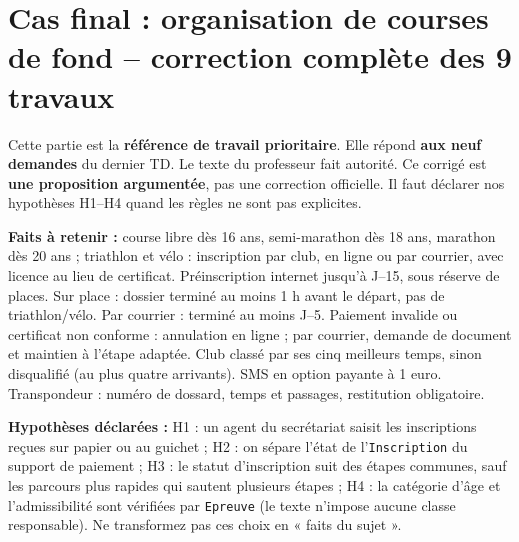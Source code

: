 \section{Cas final : organisation de courses de fond -- correction complète des 9 travaux}
\begin{memo}
Cette partie est la \textbf{référence de travail prioritaire}. Elle répond \textbf{aux neuf demandes} du dernier TD. Le texte du professeur fait autorité. Ce corrigé est \textbf{une proposition argumentée}, pas une correction officielle. Il faut déclarer nos hypothèses H1--H4 quand les règles ne sont pas explicites.
\end{memo}
\textbf{Faits à retenir :} course libre dès 16 ans, semi-marathon dès 18 ans, marathon dès 20 ans ; triathlon et vélo : inscription par club, en ligne ou par courrier, avec licence au lieu de certificat. Préinscription internet jusqu'à J--15, sous réserve de places. Sur place : dossier terminé au moins 1 h avant le départ, pas de triathlon/vélo. Par courrier : terminé au moins J--5. Paiement invalide ou certificat non conforme : annulation en ligne ; par courrier, demande de document et maintien à l'étape adaptée. Club classé par ses cinq meilleurs temps, sinon disqualifié (au plus quatre arrivants). SMS en option payante à 1 euro. Transpondeur : numéro de dossard, temps et passages, restitution obligatoire.

\begin{warningbox}
\textbf{Hypothèses déclarées :} H1 : un agent du secrétariat saisit les inscriptions reçues sur papier ou au guichet ; H2 : on sépare l'état de l'\texttt{Inscription} du support de paiement ; H3 : le statut d'inscription suit des étapes communes, sauf les parcours plus rapides qui sautent plusieurs étapes ; H4 : la catégorie d'âge et l'admissibilité sont vérifiées par \texttt{Epreuve} (le texte n'impose aucune classe responsable). Ne transformez pas ces choix en « faits du sujet ».
\end{warningbox}

